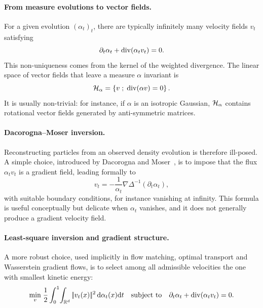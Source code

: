 \paragraph{From measure evolutions to vector fields.}

For a given evolution $(\alpha_t)_t$, there are typically infinitely many velocity fields $v_t$ satisfying
\begin{equation}\label{eq:inverse-flow}
	\partial_t\alpha_t+\operatorname{div}(\alpha_t v_t)=0.
\end{equation}
This non-uniqueness comes from the kernel of the weighted divergence. The linear space of vector fields that leave a measure $\alpha$ invariant is
\[
	\mathcal{H}_\alpha=\left\{ v \;;\; \operatorname{div}(\alpha v)=0 \right\}.
\]
It is usually non-trivial: for instance, if $\alpha$ is an isotropic Gaussian, $\mathcal{H}_\alpha$ contains rotational vector fields generated by anti-symmetric matrices.

\paragraph{Dacorogna--Moser inversion.}

Reconstructing particles from an observed density evolution is therefore ill-posed. A simple choice, introduced by Dacorogna and Moser~\cite{DacorognaMoser1990}, is to impose that the flux $\alpha_t v_t$ is a gradient field, leading formally to
\begin{equation}\label{eq:dacorogna-moser}
	v_t=-\frac{1}{\alpha_t}\nabla\Delta^{-1}(\partial_t\alpha_t),
\end{equation}
with suitable boundary conditions, for instance vanishing at infinity. This formula is useful conceptually but delicate when $\alpha_t$ vanishes, and it does not generally produce a gradient velocity field.

\paragraph{Least-square inversion and gradient structure.}

A more robust choice, used implicitly in flow matching, optimal transport and Wasserstein gradient flows, is to select among all admissible velocities the one with smallest kinetic energy:
\begin{equation}\label{eq:least-square-field}
	\underset{v}{\min}\;
	\frac12\int_0^1\!\int_{\mathbb{R}^d}|\!| v_t(x) |\!|^2\,\mathrm{d}\alpha_t(x)\mathrm{d} t
	\quad
	\text{subject to}
	\quad
	\partial_t\alpha_t+\operatorname{div}(\alpha_t v_t)=0.
\end{equation}

